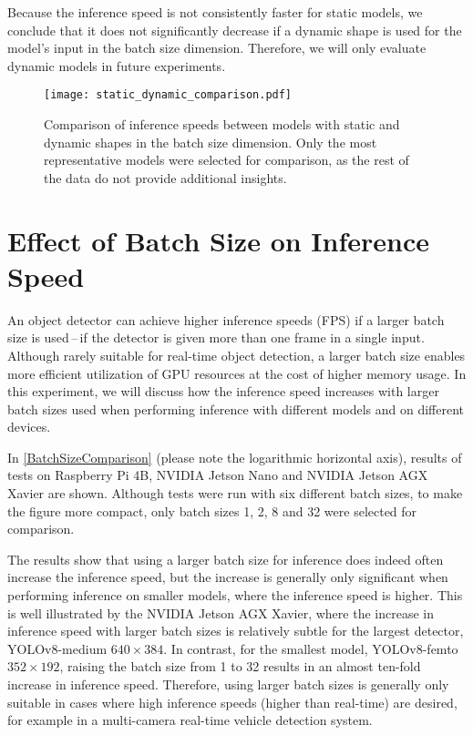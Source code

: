 Because the inference speed is not consistently faster for static models, we
conclude that it does not significantly decrease if a dynamic shape is used for
the model's input in the batch size dimension. Therefore, we will only evaluate
dynamic models in future experiments.

\begin{figure}[h]
    \begin{framed}
        \centering
        \texttt{[image: static\_dynamic\_comparison.pdf]}
        \caption{Comparison of inference speeds between models with static and
        dynamic shapes in the batch size dimension. Only the most representative
        models were selected for comparison, as the rest of the data do not
        provide additional insights.}
        \label{StaticDynamicModelShape}
    \end{framed}
\end{figure}







\section{Effect of Batch Size on Inference Speed}
\label{BatchSizeComparisonSection}

An object detector can achieve higher inference speeds (FPS) if a larger batch
size is used\,--\,if the detector is given more than one frame in a single
input. Although rarely suitable for real-time object detection, a larger batch
size enables more efficient utilization of GPU resources at the cost of higher
memory usage. In this experiment, we will discuss how the inference speed
increases with larger batch sizes used when performing inference with different
models and on different devices.

In \autoref{BatchSizeComparison} (please note the logarithmic horizontal axis),
results of tests on Raspberry Pi 4B, NVIDIA Jetson Nano and NVIDIA Jetson AGX
Xavier are shown. Although tests were run with six different batch sizes, to
make the figure more compact, only batch sizes 1, 2, 8 and 32 were selected for
comparison.

The results show that using a larger batch size for inference does indeed often
increase the inference speed, but the increase is generally only significant
when performing inference on smaller models, where the inference speed is
higher. This is well illustrated by the NVIDIA Jetson AGX Xavier, where the
increase in inference speed with larger batch sizes is relatively subtle for the
largest detector, YOLOv8-medium $640 \times 384$. In contrast, for the smallest
model, YOLOv8-femto $352 \times 192$, raising the batch size from 1 to 32
results in an almost ten-fold increase in inference speed. Therefore, using
larger batch sizes is generally only suitable in cases where high inference
speeds (higher than real-time) are desired, for example in a multi-camera
real-time vehicle detection system.

